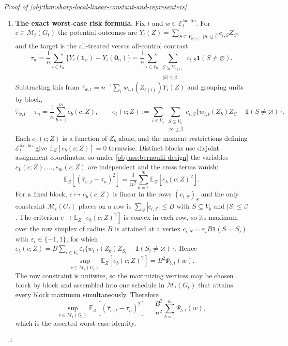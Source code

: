 \begin{proof}[Proof of \cref{obj:thm:sharp-local-linear-constant-and-representers}]
\begin{enumerate}
\item \textbf{The exact worst-case risk formula.}  Fix \(t\) and \(w\in\mathcal E_t^{\mathrm{loc,lin}}\).  For \(c\in\mathcal M_t(G_t)\) the potential outcomes are \(Y_i(Z)=\sum_{S\subseteq V_{b(i)},\,|S|\le\bar\beta}c_{i,S}Z_S\), and the target is the all-treated versus all-control contrast
\[
\tau_{n}
=
\frac1n\sum_{i\in V_{n}}\{Y_i(\mathbf 1_{n})-Y_i(\mathbf 0_{n})\}
=
\frac1n\sum_{i\in V_{n}}
\sum_{\substack{S\subseteq V_{b(i)}\\ |S|\le\bar\beta}}
c_{i,S}\mathbf 1(S\ne\varnothing).
\]
Subtracting this from \(\widehat\tau_{w,t}=n^{-1}\sum_i w_{i,t}(Z_{b(i)})Y_i(Z)\) and grouping units by block,
\[
\widehat\tau_{w,t}-\tau_{n}
=
\frac1n\sum_{b=1}^{m}e_{b}(c;Z),
\qquad
e_{b}(c;Z)
:=
\sum_{i\in V_b}
\sum_{\substack{S\subseteq V_b\\ |S|\le\bar\beta}}
c_{i,S}\bigl\{w_{i,t}(Z_b)Z_S-\mathbf 1(S\ne\varnothing)\bigr\}.
\]
Each \(e_{b}(c;Z)\) is a function of \(Z_b\) alone, and the moment restrictions defining \(\mathcal E_t^{\mathrm{loc,lin}}\) give \(\mathbb E_Z[e_{b}(c;Z)]=0\) termwise.  Distinct blocks use disjoint assignment coordinates, so under \cref{obj:ass:bernoulli-design} the variables \(e_1(c;Z),\ldots,e_{m}(c;Z)\) are independent and the cross terms vanish:
\[
\mathbb E_Z\!\left[(\widehat\tau_{w,t}-\tau_{n})^2\right]
=
\frac{1}{n^2}\sum_{b=1}^{m}\mathbb E_Z\!\left[e_{b}(c;Z)^2\right].
\]
For a fixed block, \(c\mapsto e_{b}(c;Z)\) is linear in the rows \((c_{i,S})_{S}\) and the only constraint \(\mathcal M_t(G_t)\) places on a row is \(\sum_{S}|c_{i,S}|\le B\) with \(S\subseteq V_b\) and \(|S|\le\bar\beta\).  The criterion \(c\mapsto\mathbb E_Z[e_{b}(c;Z)^2]\) is convex in each row, so its maximum over the row simplex of radius \(B\) is attained at a vertex \(c_{i,S}=\varepsilon_iB\mathbf 1(S=S_i)\) with \(\varepsilon_i\in\{-1,1\}\), for which \(e_{b}(c;Z)=B\sum_{i\in V_b}\varepsilon_i\{w_{i,t}(Z_b)Z_{S_i}-\mathbf 1(S_i\ne\varnothing)\}\).  Hence
\[
\sup_{c\in\mathcal M_t(G_t)}\mathbb E_Z\!\left[e_{b}(c;Z)^2\right]
=
B^2\Psi_{b,t}(w).
\]
The row constraint is unitwise, so the maximizing vertices may be chosen block by block and assembled into one schedule in \(\mathcal M_t(G_t)\) that attains every block maximum simultaneously.  Therefore
\[
\sup_{c\in\mathcal M_t(G_t)}
\mathbb E_Z\!\left[(\widehat\tau_{w,t}-\tau_{n})^2\right]
=
\frac{B^2}{n^2}\sum_{b=1}^{m}\Psi_{b,t}(w),
\]
which is the asserted worst-case identity. %


\end{enumerate}
\end{proof}
